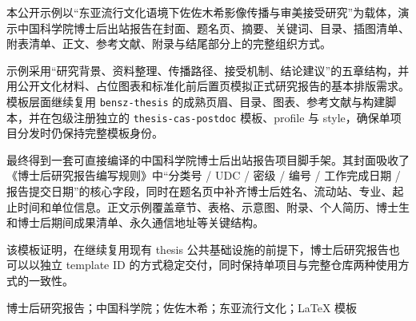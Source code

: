 本公开示例以“东亚流行文化语境下佐佐木希影像传播与审美接受研究”为载体，演示中国科学院博士后出站报告在封面、题名页、摘要、关键词、目录、插图清单、附表清单、正文、参考文献、附录与结尾部分上的完整组织方式。

示例采用“研究背景、资料整理、传播路径、接受机制、结论建议”的五章结构，并用公开文化材料、占位图表和标准化前后置页模拟正式研究报告的基本排版需求。模板层面继续复用 \texttt{bensz-thesis} 的成熟页眉、目录、图表、参考文献与构建脚本，并在包级注册独立的 \texttt{thesis-cas-postdoc} 模板、profile 与 style，确保单项目分发时仍保持完整模板身份。

最终得到一套可直接编译的中国科学院博士后出站报告项目脚手架。其封面吸收了《博士后研究报告编写规则》中“分类号 / UDC / 密级 / 编号 / 工作完成日期 / 报告提交日期”的核心字段，同时在题名页中补齐博士后姓名、流动站、专业、起止时间和单位信息。正文示例覆盖章节、表格、示意图、附录、个人简历、博士生和博士后期间成果清单、永久通信地址等关键结构。

该模板证明，在继续复用现有 thesis 公共基础设施的前提下，博士后研究报告也可以以独立 template ID 的方式稳定交付，同时保持单项目与完整仓库两种使用方式的一致性。

博士后研究报告；中国科学院；佐佐木希；东亚流行文化；LaTeX 模板
